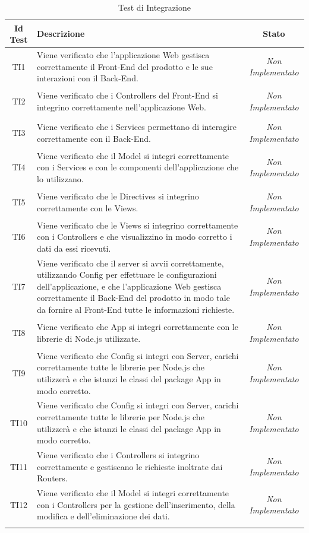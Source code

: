 \normalsize
\begin{longtable}[ht]{|c|>{}m{10cm}|c|}
\hline 
\textbf{Id Test} & \textbf{Descrizione} & \textbf{Stato}\\
\hline
\endhead
\hypertarget{TI1}{TI1} & Viene verificato che l’applicazione Web gestisca
correttamente il Front-End del prodotto e le sue interazioni
con il Back-End. & \textit{Non Implementato}\\ \hline
\hypertarget{TI2}{TI2} & Viene verificato che i Controllers del Front-End si integrino
correttamente nell’applicazione Web. & \textit{Non Implementato}\\ \hline
\hypertarget{TI3}{TI3} & Viene verificato che i Services permettano di interagire
correttamente con il Back-End. & \textit{Non Implementato}\\ \hline
\hypertarget{TI4}{TI4} & Viene verificato che il Model si integri correttamente con i
Services e con le componenti dell’applicazione che lo
utilizzano. & \textit{Non Implementato}\\ \hline
\hypertarget{TI5}{TI5} & Viene verificato che le Directives si integrino correttamente
con le Views. & \textit{Non Implementato}\\ \hline
\hypertarget{TI6}{TI6} & Viene verificato che le Views si integrino correttamente con i
Controllers e che visualizzino in modo corretto i dati da essi
ricevuti. & \textit{Non Implementato}\\ \hline
\hypertarget{TI7}{TI7} & Viene verificato che il server si avvii correttamente,
utilizzando Config per effettuare le configurazioni
dell’applicazione, e che l’applicazione Web gestisca
correttamente il Back-End del prodotto in modo tale da
fornire al Front-End tutte le informazioni richieste. & \textit{Non Implementato}\\ \hline
\hypertarget{TI8}{TI8} & Viene verificato che App si integri correttamente con le
librerie di Node.js utilizzate. & \textit{Non Implementato}\\ \hline
\hypertarget{TI9}{TI9} & Viene verificato che Config si integri con Server, carichi
correttamente tutte le librerie per Node.js che utilizzerà e
che istanzi le classi del package App in modo corretto. & \textit{Non Implementato}\\ \hline
\hypertarget{TI10}{TI10} & Viene verificato che Config si integri con Server, carichi
correttamente tutte le librerie per Node.js che utilizzerà e
che istanzi le classi del package App in modo corretto. & \textit{Non Implementato}\\ \hline
\hypertarget{TI11}{TI11} & Viene verificato che i Controllers si integrino correttamente
e gestiscano le richieste inoltrate dai Routers. & \textit{Non Implementato}\\ \hline
\hypertarget{TI12}{TI12} & Viene verificato che il Model si integri correttamente con i
Controllers per la gestione dell’inserimento, della modifica e
dell’eliminazione dei dati. & \textit{Non Implementato}\\ \hline
\caption[Test di Integrazione]{Test di Integrazione}
\label{tabella:test2}
\end{longtable}
\clearpage